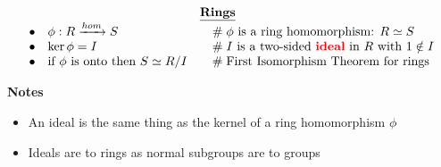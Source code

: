 \documentclass{article}
\theoremstyle{definition}
\begin{document}
\begin{mybox}
\begin{equation*}
\begin{array}{lllll}
&& \underline{\mathbf{Rings}} \\ 
\bullet&  \phi: R \xrightarrow{hom} S                           &\quad  \mathrel{\#} \text{$\phi$ is a ring homomorphism: $R \simeq S$}   \\
\bullet&  \ker \phi = I                                                     &\quad  \mathrel{\#} \text{$I$ is a two-sided \textbf{{\color{red} ideal}} in $R$ with $1 \notin I$}  \\
\bullet&  \text{if $\phi$ is onto then $S \simeq R/I$}   &\quad \mathrel{\#} \text{First Isomorphism Theorem for rings}
\end{array}
\end{equation*}
\end{mybox}

\bigskip
\bigskip
\noindent
\textbf{Notes}
\begin{itemize}
\item An ideal is the same thing as the kernel of a ring homomorphism $\phi$
\item Ideals are to rings as normal subgroups are to groups
\end{itemize}
\end{document}
